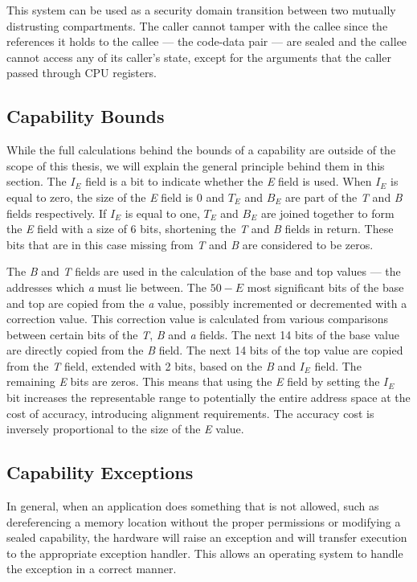 This system can be used as a security domain transition between two mutually distrusting compartments. The caller cannot tamper with the callee since the references it holds to the callee --- the code-data pair --- are sealed and the callee cannot access any of its caller's state, except for the arguments that the caller passed through CPU registers.

\subsection{Capability Bounds}
\label{sec:bounds}
While the full calculations behind the bounds of a capability are outside of the scope of this thesis, we will explain the general principle behind them in this section. The $I_E$ field is a bit to indicate whether the \textit{E} field is used. When $I_E$ is equal to zero, the size of the \textit{E} field is 0 and $T_E$ and $B_E$ are part of the \textit{T} and \textit{B} fields respectively. If $I_E$ is equal to one, $T_E$ and $B_E$ are joined together to form the \textit{E} field with a size of 6 bits, shortening the \textit{T} and \textit{B} fields in return. These bits that are in this case missing from \textit{T} and \textit{B} are considered to be zeros.

The \textit{B} and \textit{T} fields are used in the calculation of the base and top values --- the addresses which \textit{a} must lie between. The $50 - E$ most significant bits of the base and top are copied from the \textit{a} value, possibly incremented or decremented with a correction value. This correction value is calculated from various comparisons between certain bits of the \textit{T}, \textit{B} and \textit{a} fields. The next 14 bits of the base value are directly copied from the \textit{B} field. The next 14 bits of the top value are copied from the \textit{T} field, extended with 2 bits, based on the \textit{B} and $I_E$ field. The remaining \textit{E} bits are zeros. This means that using the \textit{E} field by setting the $I_E$ bit increases the representable range to potentially the entire address space at the cost of accuracy, introducing alignment requirements. The accuracy cost is inversely proportional to the size of the \textit{E} value.

\subsection{Capability Exceptions}
In general, when an application does something that is not allowed, such as dereferencing a memory location without the proper permissions or modifying a sealed capability, the hardware will raise an exception and will transfer execution to the appropriate exception handler. This allows an operating system to handle the exception in a correct manner.

